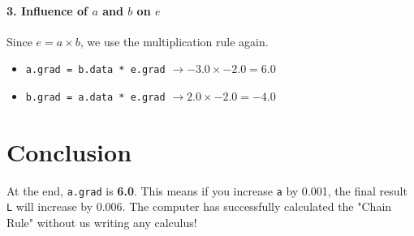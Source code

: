 \documentclass[11pt]{article}
\begin{document}
\paragraph{3. Influence of $a$ and $b$ on $e$}
Since $e = a \times b$, we use the multiplication rule again.
\begin{itemize}
    \item \texttt{a.grad = b.data * e.grad} $\rightarrow -3.0 \times -2.0 = \mathbf{6.0}$
    \item \texttt{b.grad = a.data * e.grad} $\rightarrow 2.0 \times -2.0 = \mathbf{-4.0}$
\end{itemize}

\section{Conclusion}
At the end, \texttt{a.grad} is \textbf{6.0}. This means if you increase \texttt{a} by 0.001, the final result \texttt{L} will increase by 0.006. The computer has successfully calculated the "Chain Rule" without us writing any calculus!
\end{document}

